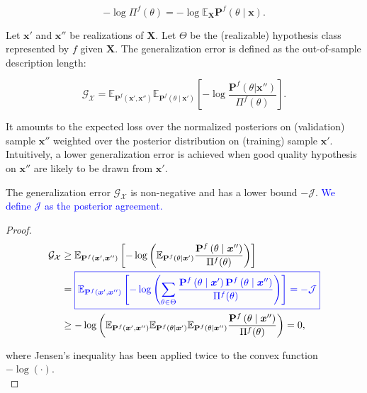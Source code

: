 $$
    - \log \Pi^f (\theta) = - \log \mathbb{E}_{\bm{X}} \mathbf{P}^f (\theta \mid \bm{x}).
$$

\begin{definition}
    Let $\bm{x'}$ and $\bm{x''}$ be realizations of $\bm{X}$.
    Let $\Theta$ be the (realizable) hypothesis class represented by $f$ given $\bm{X}$. 
    The generalization error is defined as the out-of-sample description length:

    $$
        \mathcal{G}_{\mathcal{X}} = \mathbb{E}_{\mathbf{P}^f(\bm{x}', \bm{x}'')} \mathbb{E}_{\mathbf{P}^f( \theta \mid \bm{x}')} \left[ - \log \frac{\mathbf{P}^f(\theta | \bm{x}'')}{\Pi^f (\theta)} \right].
    $$
    
\end{definition}

It amounts to the expected loss over the normalized posteriors on (validation) sample
$\bm{x}''$ weighted over the posterior distribution on (training) sample $\bm{x}'$.
Intuitively, a lower generalization error is achieved when good quality hypothesis
on $\bm{x}''$ are likely to be drawn from $\bm{x}'$. 


\begin{lemma}\label{lemma:pa}
    The generalization error $\mathcal{G}_{\mathcal{X}}$ is non-negative and has a lower bound $-\mathcal{J}$. 
    \textcolor{blue}{We define $\mathcal{J}$ as the posterior agreement.}
\end{lemma}
\begin{proof}
    $$
    \begin{aligned}
        \mathcal{G}_{\mathcal{X}} & \geq \mathbb{E}_{\mathbf{P}^f(\bm{x}', \bm{x}'')}\left[-\log \left(\mathbb{E}_{\mathbf{P}^f( \theta \mid \bm{x}')} \frac{\mathbf{P}^{f}\left(\theta \mid \bm{x}''\right)}{\Pi^{f}(\theta)}\right)\right] \\
        & = \textcolor{blue}{\boxed{\mathbb{E}_{\mathbf{P}^f(\bm{x}', \bm{x}'')} \left[-\log \left(\sum_{\theta \in \Theta} \frac{\mathbf{P}^{f}\left(\theta \mid \bm{x}'\right) \mathbf{P}^{f}\left(\theta \mid \bm{x}'' \right)}{\Pi^{f}(\theta)}\right)\right] = -\mathcal{J}}} \\
        & \geq-\log \left(\mathbb{E}_{\mathbf{P}^f(\bm{x}', \bm{x}'')} \mathbb{E}_{\mathbf{P}^f( \theta \mid \bm{x}')} \mathbb{E}_{\mathbf{P}^f(\theta \mid \bm{x}'')} \frac{\mathbf{P}^{f}\left(\theta \mid \bm{x}''\right)}{\Pi^{f}(\theta)}\right)=0,
    \end{aligned}
    $$

where Jensen's inequality has been applied twice to the convex function $-\log(\cdot)$. \\

\end{proof}

